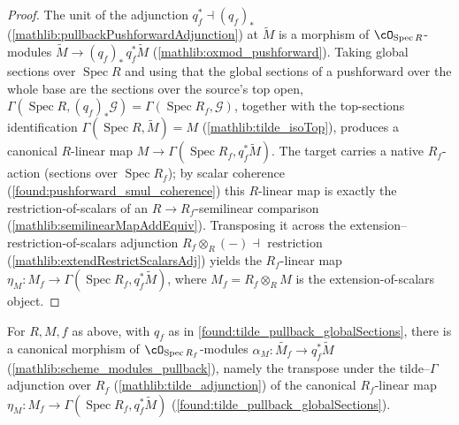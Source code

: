 \begin{proof}
  \leanok
  The unit of the adjunction \(q_f^{*}\dashv (q_f)_{*}\)
  (\cref{mathlib:pullbackPushforwardAdjunction}) at \(\widetilde M\) is a morphism
  of \(\cO_{\operatorname{Spec}R}\)-modules
  \(\widetilde M\to (q_f)_{*}\,q_f^{*}\widetilde M\)
  (\cref{mathlib:oxmod_pushforward}).  Taking global sections over
  \(\operatorname{Spec}R\) and using that the global sections of a pushforward
  over the whole base are the sections over the source's top open,
  \(\Gamma(\operatorname{Spec}R,(q_f)_{*}\mathcal G)=
  \Gamma(\operatorname{Spec}R_f,\mathcal G)\), together with the top-sections
  identification \(\Gamma(\operatorname{Spec}R,\widetilde M)=M\)
  (\cref{mathlib:tilde_isoTop}), produces a canonical \(R\)-linear map
  \(M\to\Gamma(\operatorname{Spec}R_f,q_f^{*}\widetilde M)\).  The target carries a
  native \(R_f\)-action (sections over \(\operatorname{Spec}R_f\)); by scalar
  coherence (\cref{found:pushforward_smul_coherence}) this \(R\)-linear map is exactly
  the restriction-of-scalars of an \(R\to R_f\)-semilinear comparison
  (\cref{mathlib:semilinearMapAddEquiv}).  Transposing it across the
  extension--restriction-of-scalars adjunction
  \(R_f\otimes_R(-)\dashv\) restriction (\cref{mathlib:extendRestrictScalarsAdj})
  yields the \(R_f\)-linear map
  \(\eta_M:M_f\to\Gamma(\operatorname{Spec}R_f,q_f^{*}\widetilde M)\), where
  \(M_f=R_f\otimes_R M\) is the extension-of-scalars object.
\end{proof}

\begin{lemma}
  \label{found:tilde_pullback_comparison}
  \leanok
  For \(R,M,f\) as above, with \(q_f\) as in \cref{found:tilde_pullback_globalSections},
  there is a canonical morphism of \(\cO_{\operatorname{Spec}R_f}\)-modules
  \(\alpha_M:\widetilde{M_f}\to q_f^{*}\widetilde M\)
  (\cref{mathlib:scheme_modules_pullback}), namely the transpose under the
  tilde--\(\Gamma\) adjunction over \(R_f\) (\cref{mathlib:tilde_adjunction}) of the
  canonical \(R_f\)-linear map \(\eta_M:M_f\to\Gamma(\operatorname{Spec}R_f,
  q_f^{*}\widetilde M)\) (\cref{found:tilde_pullback_globalSections}).
\end{lemma}

